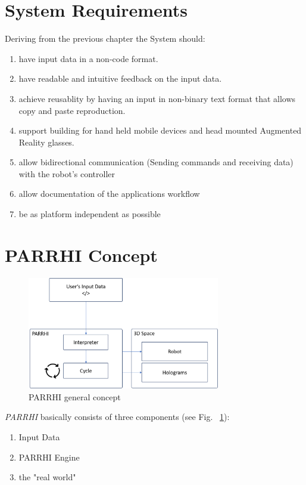 \section{System Requirements}\label{Section:SystemRequirements}
Deriving from the previous chapter the System should:
\begin{enumerate}
	\setlength\itemsep{-1em}
	\item have input data in a non-code format.
	\item have readable and intuitive feedback on the input data.
	\item achieve reusablity by having an input in non-binary text format that allows copy and paste reproduction.
	\item support building for hand held mobile devices and head mounted Augmented Reality glasses.
	\item allow bidirectional communication (Sending commands and receiving data) with the robot's controller 
	\item allow documentation of the applications workflow
	\item be as platform independent as possible
\end{enumerate}

\section{PARRHI Concept}
\begin{figure}
	\centering
	\includegraphics[width=0.75\textwidth]{Figures/PARRHIConcept01.png}
	\caption{PARRHI general concept}
	\label{Fig:PARRHIConcept}
\end{figure}


\textit{PARRHI} basically consists of three components (see Fig. ~\ref{Fig:PARRHIConcept}):
\begin{enumerate}
	\setlength\itemsep{-1em}
	\item Input Data
	\item PARRHI Engine
	\item the "real world"
\end{enumerate}

